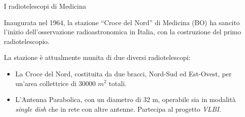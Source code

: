 \documentclass[red]{beamer}
\begin{document}
\begin{frame}{I radiotelescopi di Medicina}
	\transdissolve<2-3>
	\begin{figure}
		\label{fig:rtscopes}
	\end{figure}
			Inaugurata nel 1964, la stazione ``Croce del Nord'' di Medicina (BO)
			ha sancito l'inizio dell'osservazione radioastronomica in Italia,
			con la costruzione del primo radiotelescopio.

			La stazione è attualmente munita di due diversi radiotelescopi:
			\pause
			\begin{itemize}[<+->]
				\item La \alert{Croce del Nord}, costituita da due bracci,
					Nord-Sud ed Est-Ovest, per un'area collettrice di 30000
					$m^2$ totali.
				\item L'\alert{Antenna Parabolica}, con un diametro di 32 m,
					operabile sia in modalità \emph{single dish} che in rete con
					altre antenne. Partecipa al progetto \emph{VLBI}.
			\end{itemize}

\end{frame}
\end{document}
